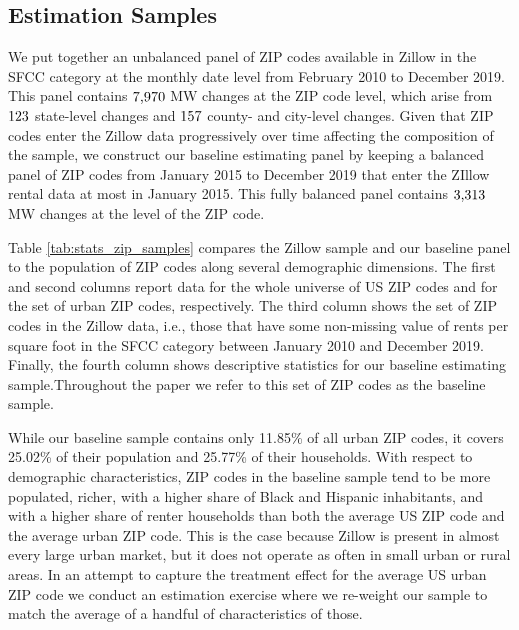 \subsection{Estimation Samples}\label{sec:data_final_panel}

We put together an unbalanced panel of ZIP codes available in Zillow in the SFCC 
category at the monthly date level from February 2010 to December 2019.
This panel contains $\textnormal{7,970}$ MW changes at the ZIP code level, 
which arise from $\textnormal{123}$ state-level changes and 
$\textnormal{157}$ county- and city-level changes.
Given that ZIP codes enter the Zillow data progressively over time affecting 
the composition of the sample,
we construct our baseline estimating panel by keeping a balanced panel of ZIP codes 
from January 2015 to December 2019 that enter the ZIllow rental data at most in January 2015.
This fully balanced panel contains $\textnormal{3,313}$ MW changes
at the level of the ZIP code.

Table \ref{tab:stats_zip_samples} compares the Zillow sample and our baseline 
panel to the population of ZIP codes along several demographic dimensions. 
The first and second columns report data for the whole universe of US ZIP codes 
and for the set of urban ZIP codes, respectively.
The third column shows the set of ZIP codes in the Zillow data, i.e., those 
that have some non-missing value of rents per square foot in the SFCC category 
between January 2010 and December 2019.
Finally, the fourth column shows descriptive statistics for our baseline 
estimating sample.Throughout the paper we refer to this set of ZIP codes as the 
baseline sample.

While our baseline sample contains only 11.85\% of all urban ZIP codes, it covers
25.02\% of their population and 25.77\% of their households.
With respect to demographic characteristics, ZIP codes in the baseline sample 
tend to be more populated, richer, with a higher share of Black and Hispanic 
inhabitants, and with a higher share of renter households than both the average
US ZIP code and the average urban ZIP code.
This is the case because Zillow is present in almost every large urban market, 
but it does not operate as often in small urban or rural areas.
In an attempt to capture the treatment effect for the average US urban ZIP code 
we conduct an estimation exercise where we re-weight our sample to match the 
average of a handful of characteristics of those.

